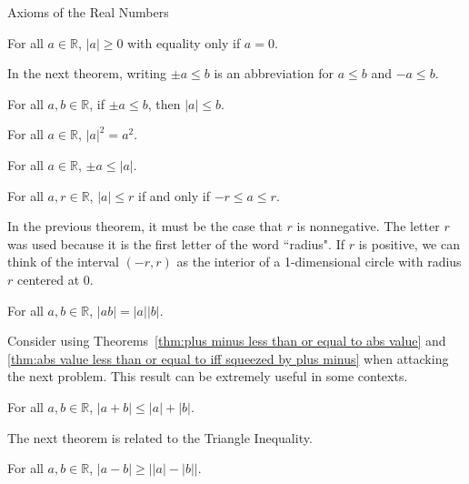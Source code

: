 \begin{section}{Axioms of the Real Numbers}
\begin{theorem}
For all $a\in\mathbb{R}$, $|a|\geq 0$ with equality only if $a=0$.
\end{theorem}

In the next theorem, writing $\pm a\leq b$ is an abbreviation for $a\leq b$ and $-a\leq b$.

\begin{theorem}
For all $a,b\in\mathbb{R}$, if $\pm a\leq b$, then $|a|\leq b$. 
\end{theorem}

\begin{theorem}
For all $a\in\mathbb{R}$, $|a|^2=a^2$.
\end{theorem}

\begin{theorem}\label{thm:plus minus less than or equal to abs value}
For all $a\in\mathbb{R}$, $\pm a\leq |a|$.
\end{theorem}

\begin{theorem}\label{thm:abs value less than or equal to iff squeezed by plus minus}
For all $a,r\in\mathbb{R}$, $|a|\leq r$ if and only if $-r\leq a\leq r$.
\end{theorem}

In the previous theorem, it must be the case that $r$ is nonnegative.  The letter $r$ was used because it is the first letter of the word ``radius". If $r$ is positive, we can think of the interval $(-r,r)$ as the interior of a 1-dimensional circle with radius $r$ centered at 0.

\begin{theorem}
For all $a,b\in\mathbb{R}$, $|ab|=|a||b|$.
\end{theorem}

Consider using Theorems~\ref{thm:plus minus less than or equal to abs value} and \ref{thm:abs value less than or equal to iff squeezed by plus minus} when attacking the next problem.  This result can be extremely useful in some contexts. 

\begin{theorem}
For all $a,b\in\mathbb{R}$, $|a+b|\leq |a|+|b|$.
\end{theorem}

The next theorem is related to the Triangle Inequality.

\begin{theorem}
For all $a,b\in\mathbb{R}$, $|a-b|\geq \left||a|-|b| \right|$.
\end{theorem}

\end{section}